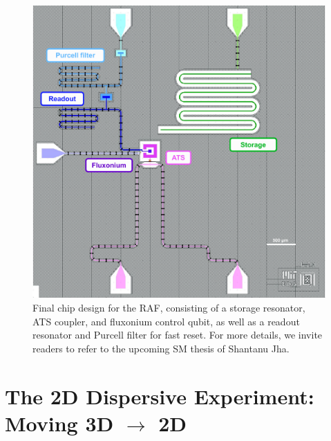 \begin{figure}[h]
    \centering
    \includegraphics[width=0.7\linewidth]{Figures/5/RAF_Final_Design.pdf}
    \caption{Final chip design for the RAF, consisting of a storage resonator, ATS coupler, and fluxonium control qubit, as well as a readout resonator and Purcell filter for fast reset. For more details, we invite readers to refer to the upcoming SM thesis of Shantanu Jha.}
    \label{fig:5_RAF_Final_Design}
\end{figure}

\clearpage


\section{The 2D Dispersive Experiment: Moving 3D \texorpdfstring{$\to$}{to} 2D\label{sec:5_2D_Disp}}

